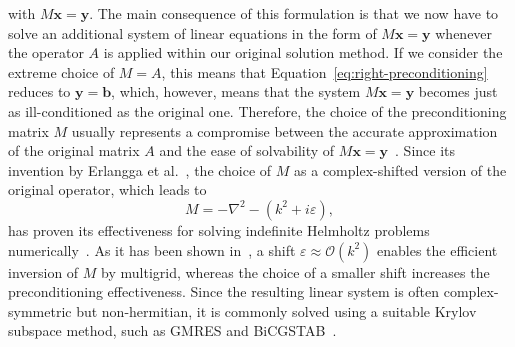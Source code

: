 with $M \bm{x} = \bm{y}$. 
The main consequence of this formulation is that we now have to solve an additional system of linear equations in the form of $M \bm{x} = \bm{y}$ whenever the operator $A$ is applied within our original solution method.
If we consider the extreme choice of $M = A$, this means that Equation~\eqref{eq:right-preconditioning} reduces to $\bm{y} = \bm{b}$, which, however, means that the system $M \bm{x} = \bm{y}$ becomes just as ill-conditioned as the original one.
Therefore, the choice of the preconditioning matrix $M$ usually represents a compromise between the accurate approximation of the original matrix $A$ and the ease of solvability of $M \bm{x} = \bm{y}$~\cite{benzi2002preconditioning}.
Since its invention by Erlangga et al.~\cite{erlangga2004preconditioner}, the choice of $M$ as a complex-shifted version of the original operator, which leads to
\begin{equation*}
	M = -\nabla ^{2} - (k^{2} + i \varepsilon),
\end{equation*}
has proven its effectiveness for solving indefinite Helmholtz problems numerically~\cite{erlangga2008advances,cocquet2017shift,umetami2009multigrid,cools2013analysis}.
As it has been shown in~\cite{cocquet2017shift}, a shift $\varepsilon \approx \mathcal{O}(k^2)$ enables the efficient inversion of $M$ by multigrid, whereas the choice of a smaller shift increases the preconditioning effectiveness.
Since the resulting linear system is often complex-symmetric but non-hermitian, it is commonly solved using a suitable Krylov subspace method, such as GMRES and BiCGSTAB~\cite{saad2003iterative}.
